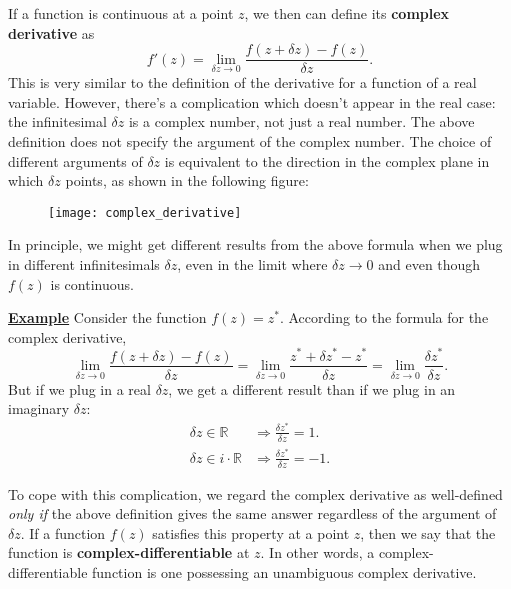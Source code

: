 \documentclass[10pt,a4paper]{article}
\begin{document}
If a function is continuous at a point $z$, we then can define its
\textbf{complex derivative} as
\begin{equation}
  f'(z) = \lim_{\delta z\rightarrow 0} \frac{f(z+\delta z) - f(z)}{\delta z}.
\end{equation}
This is very similar to the definition of the derivative for a
function of a real variable. However, there's a complication which
doesn't appear in the real case: the infinitesimal $\delta z$ is a
complex number, not just a real number. The above definition does not
specify the argument of the complex number.  The choice of different
arguments of $\delta z$ is equivalent to the direction in the complex
plane in which $\delta z$ points, as shown in the following figure:

\begin{figure}[h]
  \centering\texttt{[image: complex\_derivative]}
\end{figure}

\noindent
In principle, we might get different results from the above formula
when we plug in different infinitesimals $\delta z$, even in the limit
where $\delta z \rightarrow 0$ and even though $f(z)$ is continuous.

\begin{framed}
\noindent
\underline{\textbf{Example}}
\vskip 0.1in \noindent
Consider the function $f(z) = z^*$. According to the formula for the
complex derivative,
\begin{equation}
\lim_{\delta z \rightarrow0} \frac{f(z+\delta z) - f(z)}{\delta z} = \lim_{\delta z \rightarrow0} \frac{z^*+\delta z^* - z^*}{\delta z} = \lim_{\delta z \rightarrow0} \frac{\delta z^*}{\delta z}.
\end{equation}But
if we plug in a real $\delta z$, we get a different result than if we
plug in an imaginary
$\delta z$:
\begin{align}
  \delta z \in \mathbb{R} \;\; &\Rightarrow \frac{\delta z^*}{\delta z} = 1.\\
  \delta z \in i \cdot \mathbb{R} &\Rightarrow \frac{\delta z^*}{\delta z} = -1.
\end{align}
\end{framed}

To cope with this complication, we regard the complex derivative as
well-defined \emph{only if} the above definition gives the same answer
regardless of the argument of $\delta z$. If a function $f(z)$
satisfies this property at a point $z$, then we say that the function
is \textbf{complex-differentiable} at $z$. In other words, a
complex-differentiable function is one possessing an unambiguous
complex derivative.
\end{document}

